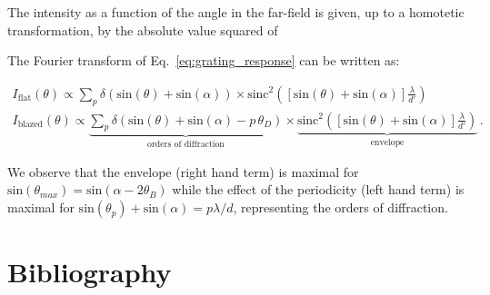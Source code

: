 \documentclass[12pt]{iopart}
\begin{document}
The intensity as a function of the angle in the far-field
is given, up to a homotetic transformation,
by the absolute value squared of

The Fourier transform of Eq.~\ref{eq:grating_response} can be written as:






\begin{equation}
  \begin{aligned}
    I_\text{flat}(\theta) \propto
    \sum_p \delta(\text{sin}(\theta)+\text{sin}(\alpha))
    \times
    \text{sinc}^2\left( \left[\text{sin}(\theta)+\text{sin}(\alpha)\right] \frac{\lambda}{d'}\right) \\
    I_\text{blazed}(\theta) \propto
    \underbrace{
      \sum_p \delta(\text{sin}(\theta)+\text{sin}(\alpha)-p\,\theta_D)
    }_\text{orders of diffraction}
    \times
    \underbrace{
      \text{sinc}^2\left( \left[\text{sin}(\theta)+\text{sin}(\alpha)\right] \frac{\lambda}{d'}\right)
    }_\text{envelope} \, .
  \end{aligned}
\end{equation}


We observe that the envelope (right hand term) is maximal for $\text{sin}(\theta_{max}) = \text{sin}(\alpha-2\theta_B)$
while the effect of the periodicity (left hand term) is maximal for $\text{sin}(\theta_p)+ \text{sin}(\alpha) = p \lambda/d$,
representing the orders of diffraction.


\section{Bibliography}




\end{document}
